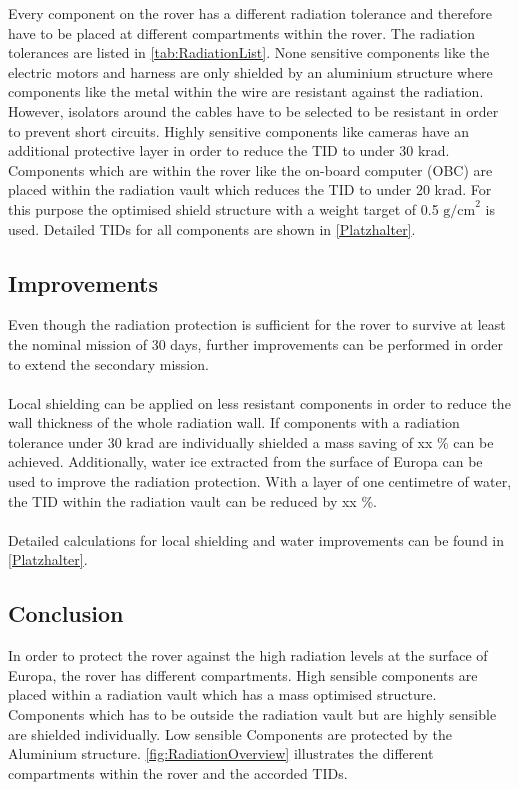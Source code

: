 Every component on the rover has a different radiation tolerance and therefore have to be placed at different compartments within the rover. The radiation tolerances are listed in \autoref{tab:RadiationList}. None sensitive components like the electric motors and harness are only shielded by an aluminium structure where components like the metal within the wire are resistant against the radiation. However, isolators around the cables have to be selected to be resistant in order to prevent short circuits. Highly sensitive components like cameras have an additional protective layer in order to reduce the TID to under 30 krad. Components which are within the rover like the on-board computer (OBC) are placed within the radiation vault which reduces the TID to under 20 krad. For this purpose the optimised shield structure with a weight target of 0.5 \(\text{g/cm}^2\) is used. Detailed TIDs for all components are shown in \autoref{Platzhalter}.

\subsection{Improvements}

Even though the radiation protection is sufficient for the rover to survive at least the nominal mission of 30 days, further improvements can be performed in order to extend the secondary mission. \\ \\
Local shielding can be applied on less resistant components in order to reduce the wall thickness of the whole radiation wall. If components with a radiation tolerance under 30 krad are individually shielded a mass saving of xx \% can be achieved. Additionally, water ice extracted from the surface of Europa can be used to improve the radiation protection. With a layer of one centimetre of water, the TID within the radiation vault can be reduced by xx \%. \\ \\
Detailed calculations for local shielding and water improvements can be found in \autoref{Platzhalter}.

\subsection{Conclusion}

In order to protect the rover against the high radiation levels at the surface of Europa, the rover has different compartments. High sensible components are placed within a radiation vault which has a mass optimised structure. Components which has to be outside the radiation vault but are highly sensible are shielded individually. Low sensible Components are protected by the Aluminium structure. \autoref{fig:RadiationOverview} illustrates the different compartments within the rover and the accorded TIDs.

